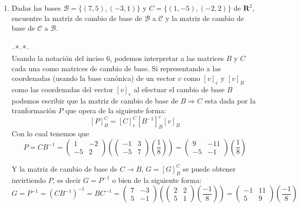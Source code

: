 \documentclass[letter]{memoir} %
\begin{document}
\begin{enumerate}
\item Dadas las bases $\mathcal{B} = \{ (7,5),(-3,1) \}$ y $C=\{(1,-5), (-2,2)\}$ de $\mathbf{R}^2$, encuentre la matriz de cambio de base de $\mathcal{B}$ a $\mathcal{C}$ y la matriz de cambio de base de $\mathcal{C}$ a \textbf{$\mathcal{B}$}.\\\\
--*--*--\\
Usando la notación del inciso 6, podemos interpretar a las matrices $B$ y $C$ cada una como matrices de cambio de base. Si representando a las coordenadas (usando la base canónica) de un vector  $v$ como $[v]_e$ y $[v]_B$ como las coordenadas del vector $[v]_e$ al efectuar el cambio de base $B$ podemos escribir que la matriz de cambio de base de $B\Rightarrow C$ esta dada por la tranformación $P$ que opera de la siguiente forma:
\[ [P]_B^C = [C]_e^C[B^{-1}]_B^e[v]_B\]
Con lo cual tenemos que 
\[
P = CB^{-1} = \left( \begin{array}{cc}
					1 & -2 \\
                    -5 & 2
				\end{array} \right)
                \left( \left(\begin{array}{cc}
					-1 & 3 \\
                    -5 & 7
				\end{array} \right) \left( \frac{1}{8}\right) \right) =
                \left(\begin{array}{cc}
					9 & -11 \\
                    -5 &-1
				\end{array} \right) \left( \frac{1}{8}\right)
\] 

Y la matriz de cambio de base de $C\rightarrow B$, $G = [G]_B^C$ se puede obtener invirtiendo $P$, es decir $G = P^{-1}$ o bien de la siguiente forma:
\[
G = P^{-1} =(CB^{-1})^{-1} = BC^{-1} = \left( \begin{array}{cc}
					7 & -3 \\
                    5 & -1
				\end{array} \right)
                \left( \left(\begin{array}{cc}
					2 & 2 \\
                    5 & 1
				\end{array} \right) \left( \frac{-1}{8}\right) \right) =
                \left(\begin{array}{cc}
					-1 & 11 \\
                    5 & 9
				\end{array} \right) \left( \frac{-1}{8}\right)
\] 



\end{enumerate}
\end{document}
